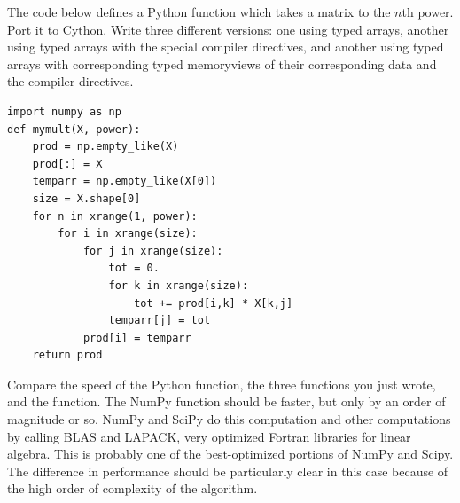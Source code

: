 \begin{problem}
The code below defines a Python function which takes a matrix to the $n$th power.
Port it to Cython.
Write three different versions: one using typed arrays, another using typed arrays with the special compiler directives, and another using typed arrays with corresponding typed memoryviews of their corresponding data and the compiler directives.
\begin{lstlisting}
import numpy as np
def mymult(X, power):
    prod = np.empty_like(X)
    prod[:] = X
    temparr = np.empty_like(X[0])
    size = X.shape[0]
    for n in xrange(1, power):
        for i in xrange(size):
            for j in xrange(size):
                tot = 0.
                for k in xrange(size):
                    tot += prod[i,k] * X[k,j]
                temparr[j] = tot
            prod[i] = temparr
    return prod
\end{lstlisting}

Compare the speed of the Python function, the three functions you just wrote, and the  function.
The NumPy function should be faster, but only by an order of magnitude or so.
NumPy and SciPy do this computation and other computations by calling BLAS and LAPACK, very optimized Fortran libraries for linear algebra.
This is probably one of the best-optimized portions of NumPy and Scipy.
The difference in performance should be particularly clear in this case because of the high order of complexity of the algorithm.
\end{problem}


